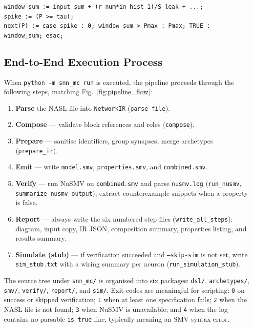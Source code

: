 \documentclass[
]{ceurart}
\begin{document}
\begin{lstlisting}[style=smvcode,caption={$\sigma$-window LIF update emitted by \texttt{lif\_module.py}.},label=lst:lif-smv]
window_sum := input_sum + (r_num*in_hist_1)/S_leak + ...;
spike := (P >= tau);
next(P) := case spike : 0; window_sum > Pmax : Pmax; TRUE : window_sum; esac;
\end{lstlisting}

\subsection{End-to-End Execution Process}
\label{subsec:end-to-end}

When \texttt{python -m snn\_mc run} is executed, the pipeline proceeds
through the following steps, matching Fig.~\ref{fig:pipeline_flow}:
\begin{enumerate}
\item \textbf{Parse} the \textsc{NASL} file into \texttt{NetworkIR} (\texttt{parse\_file}).
\item \textbf{Compose} --- validate block references and roles (\texttt{compose}).
\item \textbf{Prepare} --- sanitise identifiers, group synapses, merge
      archetypes (\texttt{prepare\_ir}).
\item \textbf{Emit} --- write \texttt{model.smv}, \texttt{properties.smv},
      and \texttt{combined.smv}.
\item \textbf{Verify} --- run NuSMV on \texttt{combined.smv} and parse
      \texttt{nusmv.log} (\texttt{run\_nusmv}, \texttt{summarize\_nusmv\_output});
      extract counterexample snippets when a property is false.
\item \textbf{Report} --- always write the six numbered step files
      (\texttt{write\_all\_steps}): diagram, input copy, IR JSON, composition
      summary, properties listing, and results summary.
\item \textbf{Simulate (stub)} --- if verification succeeded and
      \texttt{--skip-sim} is not set, write \texttt{sim\_stub.txt} with a
      wiring summary per neuron (\texttt{run\_simulation\_stub}).
\end{enumerate}

The source tree under \texttt{snn\_mc/} is organised into six packages:
\texttt{dsl/}, \texttt{archetypes/}, \texttt{smv/}, \texttt{verify/},
\texttt{report/}, and \texttt{sim/}. Exit codes are meaningful for
scripting: \texttt{0} on success or skipped verification; \texttt{1} when
at least one specification fails; \texttt{2} when the \textsc{NASL} file
is not found; \texttt{3} when NuSMV is unavailable; and \texttt{4} when
the log contains no parsable \texttt{is true} line, typically meaning an
SMV syntax error.
\end{document}
